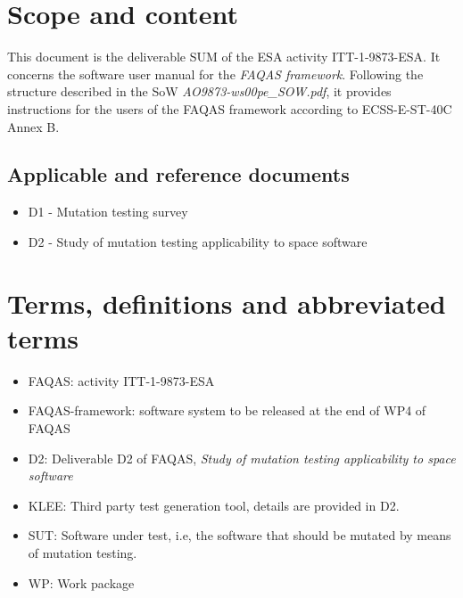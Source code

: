 
\chapter{Scope and content}

This document is the deliverable SUM of the ESA activity ITT-1-9873-ESA. It concerns the software user manual for the \emph{FAQAS framework}.
 Following the structure described in the SoW \emph{AO9873-ws00pe\_SOW.pdf}, it provides instructions for the users of the FAQAS framework according to ECSS-E-ST-40C Annex B.
 
 
\section{Applicable and reference documents}

\begin{itemize}
\item{D1 - Mutation testing survey}
\item{D2 - Study of mutation testing applicability to space software}
\end{itemize}

\chapter{Terms, definitions and abbreviated terms}

\begin{itemize}
\item{FAQAS}: activity ITT-1-9873-ESA
\item{FAQAS-framework}: software system to be released at the end of WP4 of FAQAS
\item{D2}: Deliverable D2 of FAQAS, \emph{Study of mutation testing applicability to space software}
\item{KLEE}: Third party test generation tool, details are provided in D2.
\item{SUT}: Software under test, i.e, the software that should be mutated by means of mutation testing.
\item{WP}: Work package
\end{itemize}

\clearpage
 

